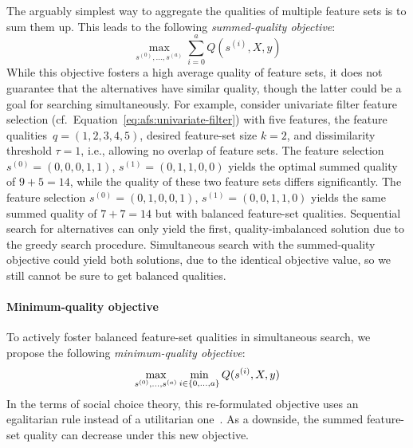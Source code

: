 \documentclass{article}
\theoremstyle{definition}
\begin{document}
The arguably simplest way to aggregate the qualities of multiple feature sets is to sum them up.
This leads to the following \emph{summed-quality objective}:
%
\begin{equation}
	\max_{s^{(0)}, \dots, s^{(a)}} \sum_{i=0}^a Q(s^{(i)},X,y)
	\label{eq:afs:afs-simultaneous-sum-objective}
\end{equation}
%
While this objective fosters a high average quality of feature sets, it does not guarantee that the alternatives have similar quality, though the latter could be a goal for searching simultaneously.
For example, consider univariate filter feature selection (cf.~Equation~\ref{eq:afs:univariate-filter}) with five features, the feature qualities~$q = (1,2,3,4,5)$, desired feature-set size $k=2$, and dissimilarity threshold $\tau = 1$, i.e., allowing no overlap of feature sets.
The feature selection $s^{(0)} = (0,0,0,1,1)$, $s^{(1)} = (0,1,1,0,0)$ yields the optimal summed quality of $9+5=14$, while the quality of these two feature sets differs significantly.
The feature selection $s^{(0)} = (0,1,0,0,1)$, $s^{(1)} = (0,0,1,1,0)$ yields the same summed quality of $7+7=14$ but with balanced feature-set qualities.
Sequential search for alternatives can only yield the first, quality-imbalanced solution due to the greedy search procedure.
Simultaneous search with the summed-quality objective could yield both solutions, due to the identical objective value, so we still cannot be sure to get balanced qualities.

\paragraph{Minimum-quality objective}

To actively foster balanced feature-set qualities in simultaneous search, we propose the following \emph{minimum-quality objective}:
%
\begin{equation}
	\max_{s^{(0)}, \dots, s^{(a)}} \min_{i \in \{0, \dots, a\}} Q(s^{(i)},X,y) \\
	\label{eq:afs:afs-simultaneous-min-objective}
\end{equation}
%
In the terms of social choice theory, this re-formulated objective uses an egalitarian rule instead of a utilitarian one~\cite{myerson1981utilitarianism}.
As a downside, the summed feature-set quality can decrease under this new objective.
\end{document}
